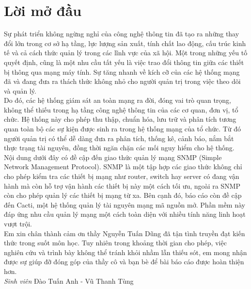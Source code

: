 \documentclass[12pt,oneside,a4paper]{article}
\theoremstyle{definition}
\begin{document}
	\setlength{\parindent}{0pt}

	\newpage
	\tableofcontents
	\newpage
	

\section*{Lời mở đầu}
%
Sự phát triển không ngừng nghỉ của công nghệ thông tin đã tạo ra những thay đổi lớn trong cơ sở hạ tầng, lực lượng sản xuất, tính chất lao động, cấu trúc kinh tế và cả cách thức quản lý trong các lĩnh vực của xã hội. Một trong những yếu tố quyết định, cũng là một nhu cầu tất yếu là việc trao đổi thông tin giữa các thiết bị thông qua mạng máy tính. Sự tăng nhanh về kích cỡ của các hệ thống mạng đã và đang đưa ra thách thức không nhỏ cho người quản trị trong việc theo dõi và quản lý.\\

Do đó, các hệ thống giám sát an toàn mạng ra đời, đóng vai trò quan trọng, không thể thiếu trong hạ tầng công nghệ thông tin của các cơ quan, đơn vị, tổ chức. Hệ thống này cho phép thu thập, chuẩn hóa, lưu trữ và phân tích tương quan toàn bộ các sự kiện được sinh ra trong hệ thống mạng của tổ chức. Từ đó người quản trị có thể dễ dàng đưa ra phân tích, thống kê, cảnh báo, nắm bắt thực trạng tài nguyên, đồng thời ngăn chặn các mối nguy hiểm cho hệ thống.\\

Nội dung dưới đây có đề cập đến giao thức quản lý mạng SNMP (Simple Network Management Protocol). SNMP là một tập hợp các giao thức không chỉ cho phép kiểm tra các thiết bị mạng như router, switch hay server có đang vận hành mà còn hỗ trợ vận hành các thiết bị này một cách tối ưu, ngoài ra SNMP còn cho phép quản lý các thiết bị mạng từ xa. Bên cạnh đó, báo cáo còn đề cập đến Cacti, một hệ thống quản lý tài nguyên mạng mã nguồn mở. Phần mềm này đáp ứng nhu cầu quản lý mạng một cách toàn diện với nhiều tính năng linh hoạt vượt trội.\\

Em xin chân thành cảm ơn thầy Nguyễn Tuấn Dũng đã tận tình truyền đạt kiến thức trong suốt môn học. Tuy nhiên trong khoảng thời gian cho phép, việc nghiên cứu và trình bày không thể tránh khỏi nhầm lẫn thiếu sót, em mong nhận được sự giúp đỡ đóng góp của thầy cô và bạn bè để bài báo cáo được hoàn thiện hơn.\\

\textit{Sinh viên}
Đào Tuấn Anh - Vũ Thanh Tùng
\newpage
\end{document}

